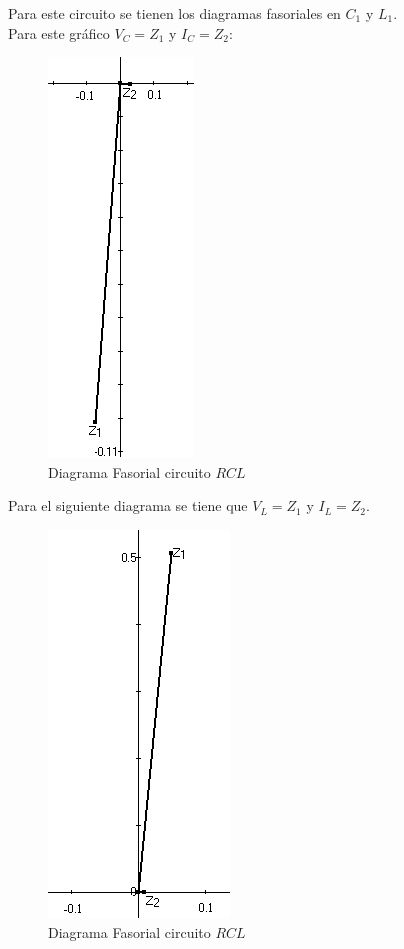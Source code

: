 \documentclass[twocolumn]{IEEEtran}
\begin{document}
\noindent
Para este circuito se tienen los diagramas fasoriales en $C_1$ y $L_1$.\\
Para este gráfico $V_C=Z_1$ y $I_C=Z_2$:
\begin{figure}[H]
	\centering
		\includegraphics[scale=0.45]{fa3.png}
	\caption{Diagrama Fasorial circuito $RCL$}
	\label{fig9}
\end{figure}
\noindent
Para el siguiente diagrama se tiene que $V_L=Z_1$ y $I_L=Z_2$. 
\begin{figure}[H]
	\centering
		\includegraphics[scale=0.45]{fa4.png}
	\caption{Diagrama Fasorial circuito $RCL$}
	\label{fig10}
\end{figure}
\end{document}
